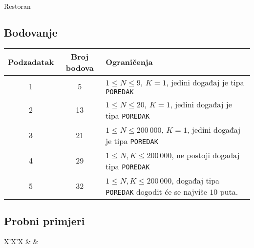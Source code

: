 \begin{statement}[
  problempoints=100,
  timelimit=1 sekunda,
  memorylimit=512 MiB,
]{Restoran}
\subsection*{Bodovanje}
{\renewcommand{\arraystretch}{1.4}
  \setlength{\tabcolsep}{6pt}
  \begin{tabular}{ccl}
 Podzadatak & Broj bodova & Ograničenja \\ \midrule
  1 & 5 & $1 \le N \le 9$, $K = 1$, jedini događaj je tipa \texttt{POREDAK} \\
  2 & 13 & $1 \le N \le 20$, $K = 1$, jedini događaj je tipa \texttt{POREDAK} \\
  3 & 21 & $1 \le N \le 200\,000$, $K = 1$, jedini događaj je tipa \texttt{POREDAK} \\
  4 & 29 & $1 \le N, K \le 200\,000$, ne postoji događaj tipa \texttt{POREDAK} \\
  5 & 32 & $1 \le N, K \le 200\,000$, događaj tipa \texttt{POREDAK} dogodit će se najviše $10$ puta.  \\
\end{tabular}}

\subsection*{Probni primjeri}
\begin{tabularx}{\textwidth}{X'X'X}
 &
 &
\end{tabularx}


\end{statement}


